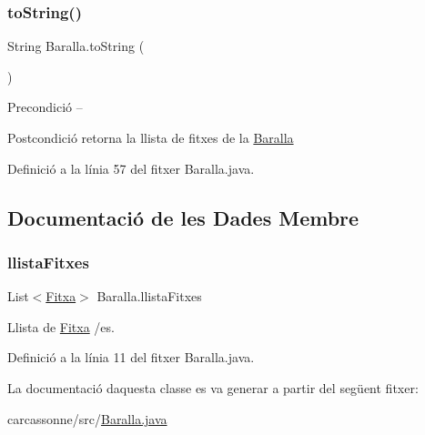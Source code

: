 \subsubsection{\texorpdfstring{to\+String()}{toString()}}
{\footnotesize\ttfamily String Baralla.\+to\+String (\begin{DoxyParamCaption}{ }\end{DoxyParamCaption})}

\begin{DoxyPrecond}{Precondició}
-- 
\end{DoxyPrecond}
\begin{DoxyPostcond}{Postcondició}
retorna la llista de fitxes de la \mbox{\hyperlink{class_baralla}{Baralla}} 
\end{DoxyPostcond}


Definició a la línia 57 del fitxer Baralla.\+java.



\subsection{Documentació de les Dades Membre}
\mbox{\label{class_baralla_a468bd8fbe440f57370538713b5b147fa}} 
\subsubsection{\texorpdfstring{llista\+Fitxes}{llistaFitxes}}
{\footnotesize\ttfamily List$<$\mbox{\hyperlink{class_fitxa}{Fitxa}}$>$ Baralla.\+llista\+Fitxes\hspace{0.3cm}{\ttfamily [private]}}



Llista de \mbox{\hyperlink{class_fitxa}{Fitxa}} /es. 



Definició a la línia 11 del fitxer Baralla.\+java.



La documentació d\textquotesingle{}aquesta classe es va generar a partir del següent fitxer\+:\begin{DoxyCompactItemize}
\item 
carcassonne/src/\mbox{\hyperlink{_baralla_8java}{Baralla.\+java}}\end{DoxyCompactItemize}

